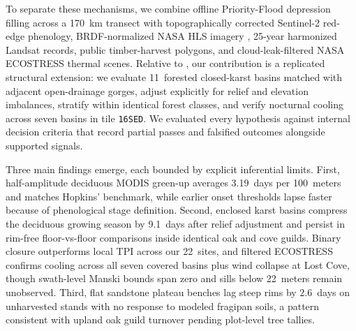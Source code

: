 To separate these mechanisms, we combine offline Priority-Flood depression filling \citep{barnes2014} across a 170~km transect with topographically corrected Sentinel-2 red-edge phenology, BRDF-normalized NASA HLS imagery \citep{claverie2018}, 25-year harmonized Landsat records, public timber-harvest polygons, and cloud-leak-filtered NASA ECOSTRESS thermal scenes. Relative to \citet{mizuno2026}, our contribution is a replicated structural extension: we evaluate 11~forested closed-karst basins matched with adjacent open-drainage gorges, adjust explicitly for relief and elevation imbalances, stratify within identical forest classes, and verify nocturnal cooling across seven basins in tile \texttt{16SED}. We evaluated every hypothesis against internal decision criteria that record partial passes and falsified outcomes alongside supported signals.

Three main findings emerge, each bounded by explicit inferential limits. First, half-amplitude deciduous MODIS green-up averages 3.19~days per 100~meters and matches Hopkins' benchmark, while earlier onset thresholds lapse faster because of phenological stage definition. Second, enclosed karst basins compress the deciduous growing season by 9.1~days after relief adjustment and persist in rim-free floor-vs-floor comparisons inside identical oak and cove guilds. Binary closure outperforms local TPI across our 22~sites, and filtered ECOSTRESS confirms cooling across all seven covered basins plus wind collapse at Lost Cove, though swath-level Manski bounds span zero and sills below 22~meters remain unobserved. Third, flat sandstone plateau benches lag steep rims by 2.6~days on unharvested stands with no response to modeled fragipan soils, a pattern consistent with upland oak guild turnover pending plot-level tree tallies.
